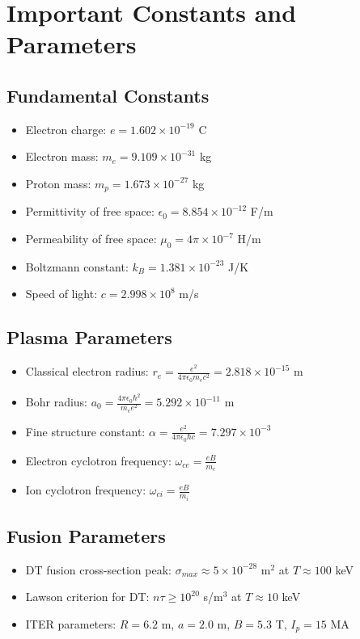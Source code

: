 \documentclass[11pt]{article}
\theoremstyle{definition}
\begin{document}
\section{Important Constants and Parameters}

\subsection{Fundamental Constants}
\begin{itemize}
    \item Electron charge: $e = 1.602 \times 10^{-19}$ C
    \item Electron mass: $m_e = 9.109 \times 10^{-31}$ kg
    \item Proton mass: $m_p = 1.673 \times 10^{-27}$ kg
    \item Permittivity of free space: $\epsilon_0 = 8.854 \times 10^{-12}$ F/m
    \item Permeability of free space: $\mu_0 = 4\pi \times 10^{-7}$ H/m
    \item Boltzmann constant: $k_B = 1.381 \times 10^{-23}$ J/K
    \item Speed of light: $c = 2.998 \times 10^8$ m/s
\end{itemize}

\subsection{Plasma Parameters}
\begin{itemize}
    \item Classical electron radius: $r_e = \frac{e^2}{4\pi \epsilon_0 m_e c^2} = 2.818 \times 10^{-15}$ m
    \item Bohr radius: $a_0 = \frac{4\pi \epsilon_0 \hbar^2}{m_e e^2} = 5.292 \times 10^{-11}$ m
    \item Fine structure constant: $\alpha = \frac{e^2}{4\pi \epsilon_0 \hbar c} = 7.297 \times 10^{-3}$
    \item Electron cyclotron frequency: $\omega_{ce} = \frac{eB}{m_e}$
    \item Ion cyclotron frequency: $\omega_{ci} = \frac{eB}{m_i}$
\end{itemize}

\subsection{Fusion Parameters}
\begin{itemize}
    \item DT fusion cross-section peak: $\sigma_{max} \approx 5 \times 10^{-28}$ m$^2$ at $T \approx 100$ keV
    \item Lawson criterion for DT: $n\tau \geq 10^{20}$ s/m$^3$ at $T \approx 10$ keV
    \item ITER parameters: $R = 6.2$ m, $a = 2.0$ m, $B = 5.3$ T, $I_p = 15$ MA
\end{itemize}
\end{document}
